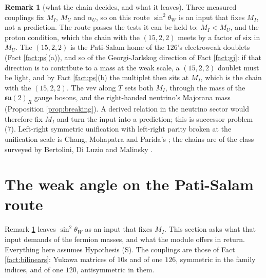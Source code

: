 \documentclass[11pt]{article}
\theoremstyle{definition}
\newtheorem{remark}[theorem]{Remark}
\newcommand{\su}{\mathfrak{su}}
\begin{document}
\begin{remark}[what the chain decides, and what it leaves]\label{rem:psinput}
Three measured couplings fix $M_{I}$, $M_{U}$ and $\alpha_{U}$, so on this route $\sin^{2}\theta_{W}$ is an input that fixes $M_{I}$, not a prediction. The route passes the tests it can be held to: $M_{I} < M_{U}$, and the proton condition, which the chain with the $(15,2,2)$ meets by a factor of six in $M_{U}$. The $(15,2,2)$ is the Pati-Salam home of the $126$'s electroweak doublets (Fact \ref{fact:ps}(a)), and so of the Georgi-Jarlskog direction of Fact \ref{fact:gj}: if that direction is to contribute to a mass at the weak scale, a $(15,2,2)$ doublet must be light, and by Fact \ref{fact:ps}(b) the multiplet then sits at $M_{I}$, which is the chain with the $(15,2,2)$. The vev along $T$ sets both $M_{I}$, through the mass of the $\su(2)_{R}$ gauge bosons, and the right-handed neutrino's Majorana mass (Proposition \ref{prop:breaking}). A derived relation in the neutrino sector would therefore fix $M_{I}$ and turn the input into a prediction; this is successor problem (7). Left-right symmetric unification with left-right parity broken at the unification scale is Chang, Mohapatra and Parida's \cite{ChangMohapatraParida1984}; the chains are of the class surveyed by Bertolini, Di Luzio and Malinsky \cite{BertoliniDiLuzioMalinsky2009}.
\end{remark}


\section{The weak angle on the Pati-Salam route}\label{sec:angle}

Remark \ref{rem:psinput} leaves $\sin^{2}\theta_{W}$ as an input that fixes $M_{I}$. This section asks what that input demands of the fermion masses, and what the module offers in return. Everything here assumes Hypothesis (S). The couplings are those of Fact \ref{fact:bilinears}: Yukawa matrices of $10$s and of one $126$, symmetric in the family indices, and of one $120$, antisymmetric in them.
\end{document}
